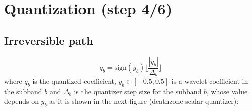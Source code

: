\section{Quantization (step 4/6)}
\subsection*{Irreversible path}  
\begin{equation}
  q_b = \text{sign}(y_b)\Big\lfloor\frac{\displaystyle
    |y_b|}{\displaystyle \Delta_b}\Big\rfloor
\tag{J2KQuant}
\end{equation}
where $q_b$ is the quantized coefficient, $y_b\in [-0.5,0.5]$ is a
wavelet coefficient in the subband $b$ and $\Delta_b$ is the quantizer
step size for the subband $b$, whose value depends on $y_b$ as it is
shown in the next figure (deathzone scalar quantizer):

\begin{center}
\end{center}

\begin{comment}
  \item \textbf{Irreversible:} tiene como entrada los coeficientes
    wavelet que est'an en el rango $[-0.5,0.5]$ y como salida una
    palabra binaria (o 'indice de cuantificaci'on) de $x$ bits que
    depende del nivel de compresi'on seleccionado. Esta consiste en
    \begin{equation}
      q_b = \text{sign}(y_b)\Big\lfloor\frac{\displaystyle
        |y_b|}{\displaystyle \Delta_b}\Big\rfloor
    \end{equation}
    donde $y_b$ es un coeficiente wavelet de la banda de frecuencia
    $b$ y $\Delta_b$ es el tama~no del paso del cuantificador escalar
    progresivo con ``deadzone'', es decir, el par'ametro que define el
    nivel de compresi'on. $\Delta_b$ es distinto para cada banda porque
    el peso relativo de cada una de ellas es diferente (v'ease la
    Secci'on \ref{sec:pesos_bandas}).

    Un ejemplo para dos primeros niveles de cuantificaci'on diferentes:
    \begin{center}
      \svg{EDQ}{600}
    \end{center}

    Los coeficientes cuantificados ('indices de cuantificaci'on) $q_b$
    son los que se codifican entr'opicamente.
\end{comment}

